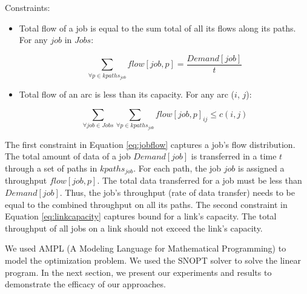 Constraints:
\begin{itemize}

\item Total flow of a job is equal to the sum total of all its flows along its paths. For any $job$ in $Jobs$: 

\begin{equation} 
\label{eq:jobflow}
\sum_{\forall p \in kpaths_{job}} flow[job, p]  = \frac{Demand[job]}{t}
\end{equation}

\item Total flow of an arc is less than its capacity. For any arc ($i$, $j$):

\begin{equation} 
\label{eq:linkcapacity}
\sum_{\forall job \in Jobs}\sum_{\forall p \in kpaths_{job}} flow[job, p]_{ij} \leq c(i, j)
\end{equation}

\end{itemize}

The first constraint in Equation \ref{eq:jobflow} captures a job's flow distribution. The total amount of data of a job $Demand[job]$ is transferred in a time $t$ through a set of paths in $kpaths_{job}$. For each path, the job $job$ is assigned a throughput $flow[job, p]$. The total data transferred for a job must be less than $Demand[job]$. Thus, the job's throughput (rate of data transfer) needs to be equal to the combined throughput on all its paths. The second constraint in Equation \ref{eq:linkcapacity} captures bound for a link's capacity. The total throughput of all jobs on a link should not exceed the link's capacity.

We used AMPL (A Modeling Language for Mathematical Programming) \cite{ampl-book} to model the optimization problem. We used the SNOPT solver to solve the linear program. In the next section, we present our experiments and results to demonstrate the efficacy of our approaches.

